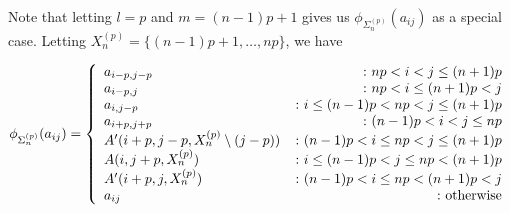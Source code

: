 \documentclass[11pt]{amsart}
\begin{document}
\noindent Note that letting $l=p$ and $m=(n-1)p+1$ gives us $\phi_{\Sigma_n^{(p)}}(a_{ij})$ as a special case.  Letting $X_n^{(p)} = \{(n-1)p+1,\ldots,np\}$, we have

$$
\phi_{\Sigma_n^{(p)}}(a_{ij}) =
\left\{
     \begin{array}{lr}
       a_{i-p,j-p} & \colon np< i<j\le (n+1)p\\
       a_{i-p,j} &\colon np< i\le (n+1)p< j\\
       a_{i,j-p} & \colon i\le(n-1)p<np< j\le(n+1)p\\
       a_{i+p,j+p} &\colon (n-1)p< i<j\le np\\
       A'(i+p,j-p,X_n^{(p)}\setminus (j-p)) & \colon (n-1)p< i\le np< j \le (n+1)p\\
       A(i,j+p,X_n^{(p)}) & \colon i\le(n-1)p< j \le np<(n+1)p\\
       A'(i+p,j,X_n^{(p)}) & \colon (n-1)p< i \le np<(n+1)p< j\\
       a_{ij} & \colon \textnormal{otherwise}
     \end{array}
\right.
$$
\end{document}
